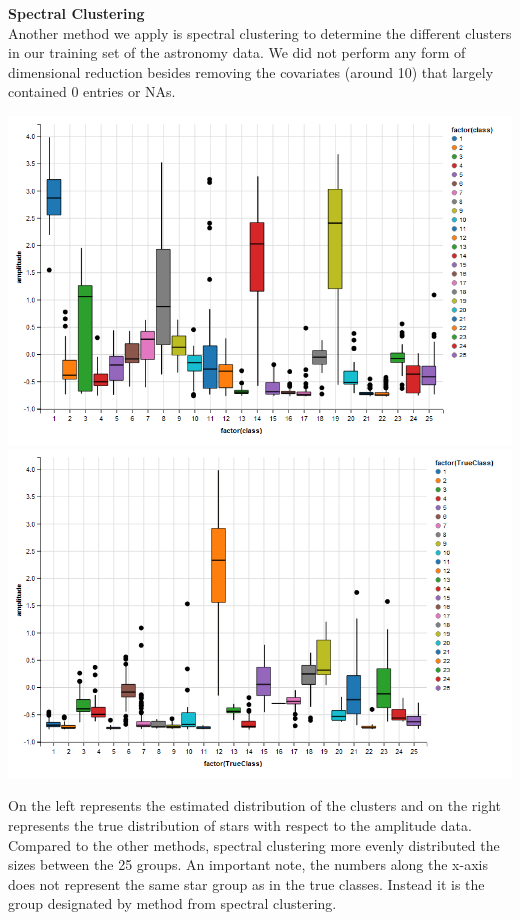 \documentclass[english,11pt]{article}
\begin{document}
\textbf{Spectral Clustering}\\
Another method we apply is spectral clustering to determine the different clusters in our training set of the astronomy data. We did not perform any form of dimensional reduction besides removing the covariates (around 10) that largely contained 0 entries or NAs.  
\begin{center}
\includegraphics[scale=0.38]{estimated.png}
\includegraphics[scale=0.38]{trueclass.png}
\end{center}
On the left represents the estimated distribution of the clusters and on the right represents the true distribution of stars with respect to the amplitude data. 
Compared to the other methods, spectral clustering more evenly distributed the sizes between the 25 groups. An important note, the numbers along the x-axis does not represent the same star group as in the true classes. Instead it is the group designated by method from spectral clustering. 
\end{document}
